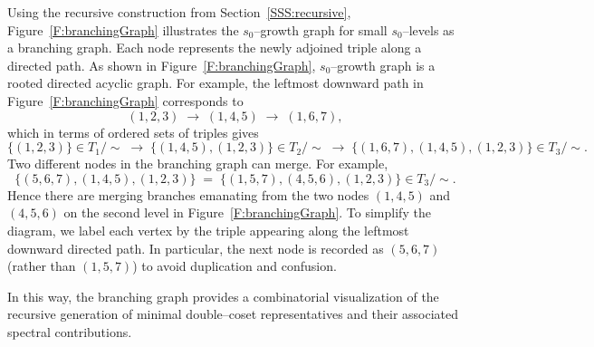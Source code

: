 \documentclass[11pt]{amsart}
\numberwithin{equation}{section}
\begin{document}
\medskip
Using the recursive construction from
Section~\ref{SSS:recursive},
Figure~\ref{F:branchingGraph} illustrates the
$s_0$--growth graph for small $s_0$--levels as a branching graph.
Each node represents the newly adjoined triple along a directed path.
As shown in Figure~\ref{F:branchingGraph}, $s_0$--growth graph is a rooted directed acyclic graph.
For example, the leftmost downward path in
Figure~\ref{F:branchingGraph} corresponds to
\[
(1,2,3) \;\longrightarrow\; (1,4,5) \;\longrightarrow\; (1,6,7),
\]
which in terms of ordered sets of triples gives
\[
\{(1,2,3)\} \in T_1/\!\sim
\;\longrightarrow\;
\{(1,4,5),(1,2,3)\} \in T_2/\!\sim
\;\longrightarrow\;
\{(1,6,7),(1,4,5),(1,2,3)\} \in T_3/\!\sim.
\]
Two different nodes in the branching graph can merge.
For example,
\[
\{(5,6,7),(1,4,5),(1,2,3)\}
\;=\;
\{(1,5,7),(4,5,6),(1,2,3)\}
\in T_3/\!\sim.
\]
Hence there are merging branches emanating from the two nodes
$(1,4,5)$ and $(4,5,6)$ on the second level in
Figure~\ref{F:branchingGraph}.
To simplify the diagram, we label each vertex by the triple
appearing along the leftmost downward directed path.
In particular, the next node is recorded as $(5,6,7)$
(rather than $(1,5,7)$) to avoid duplication and confusion.

\medskip

In this way, the branching graph provides a combinatorial visualization
of the recursive generation of minimal double--coset representatives
and their associated spectral contributions.
\end{document}
